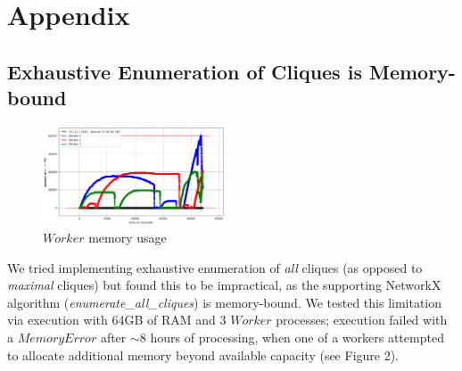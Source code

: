 \documentclass[12pt]{article}
\begin{document}
\section{Appendix}
\subsection{Exhaustive Enumeration of Cliques is Memory-bound}
\begin{figure}
  \vspace{-20pt}
  \begin{center}
    \includegraphics[width=0.48\textwidth]{workers}
  \end{center}
  \vspace{-20pt}
  \caption{$Worker$ memory usage}
  \vspace{-10pt}
\end{figure}
We tried implementing exhaustive enumeration of \textit{all} cliques (as opposed to \textit{maximal} cliques) but found this to be impractical, as the supporting NetworkX algorithm (\textit{enumerate\_all\_cliques}) is memory-bound. We tested this limitation via execution with 64GB of RAM and 3 $Worker$ processes; execution failed with a $MemoryError$ after $\sim8$ hours of processing, when one of a workers attempted to allocate additional memory beyond available capacity (see Figure 2).
\end{document}
